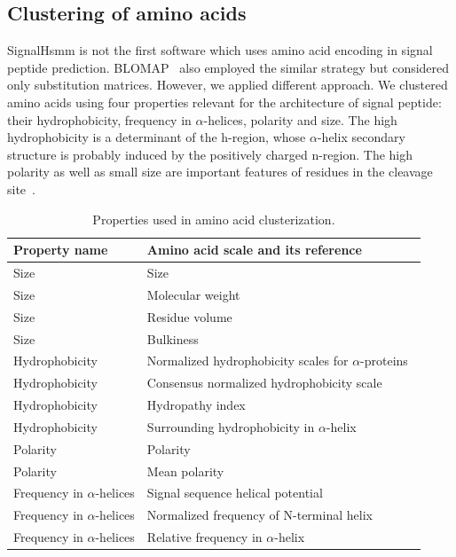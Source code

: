 \documentclass[fleqn,10pt,twoside]{gcb15submission}
\begin{document}
\subsection*{Clustering of amino acids}

SignalHsmm is not the first software which uses amino acid encoding in signal peptide prediction. BLOMAP~\citep{maetschke2005blomap} also employed the similar strategy but considered only substitution matrices. However, we applied different approach. We clustered amino acids using four properties relevant for the architecture of signal peptide: their hydrophobicity, frequency in $\alpha$-helices, polarity and size. The high hydrophobicity is a determinant of the h-region, whose $\alpha$-helix secondary structure is probably induced by the positively charged n-region. The high polarity as well as small size are important features of residues in the cleavage site~\citep{1994palzkillselection}.

\begin{table}[ht]
\small
\centering
\caption{Properties used in amino acid clusterization.} 
\begin{tabular}{ll}
  \toprule
Property name & Amino acid scale and its reference \\ 
  \midrule
Size & Size~\citep{dawson1972size} \\ 
   \rowcolor[gray]{0.85}Size & Molecular weight~\citep{fasman1976handbook}\\ 
  Size & Residue volume~\citep{1973goldsackcontribution} \\ 
   \rowcolor[gray]{0.85}Size & Bulkiness~\citep{1968zimmermanthe} \\ 
  Hydrophobicity & Normalized hydrophobicity scales for $\alpha$-proteins~\citep{1992cidhydrophobicity} \\ 
   \rowcolor[gray]{0.85}Hydrophobicity & Consensus normalized hydrophobicity scale~\citep{1984eisenbergthreedimensional} \\ 
  Hydrophobicity & Hydropathy index~\citep{1982kytea} \\ 
   \rowcolor[gray]{0.85}Hydrophobicity & Surrounding hydrophobicity in $\alpha$-helix~\citep{1980ponnuswamyhydrophobic} \\ 
  Polarity & Polarity~\citep{1974granthamamino} \\ 
   \rowcolor[gray]{0.85}Polarity & Mean polarity~\citep{1988radzickainfluences} \\ 
  Frequency in $\alpha$-helices & Signal sequence helical potential~\citep{1982argosstructural} \\ 
   \rowcolor[gray]{0.85}Frequency in $\alpha$-helices & Normalized frequency of N-terminal helix~\citep{chou1978prediction} \\ 
  Frequency in $\alpha$-helices & Relative frequency in $\alpha$-helix~\citep{1990prabhakaranthe} \\ 
   \bottomrule
\end{tabular}
\label{tab:aaprop}
\end{table}
\end{document}
